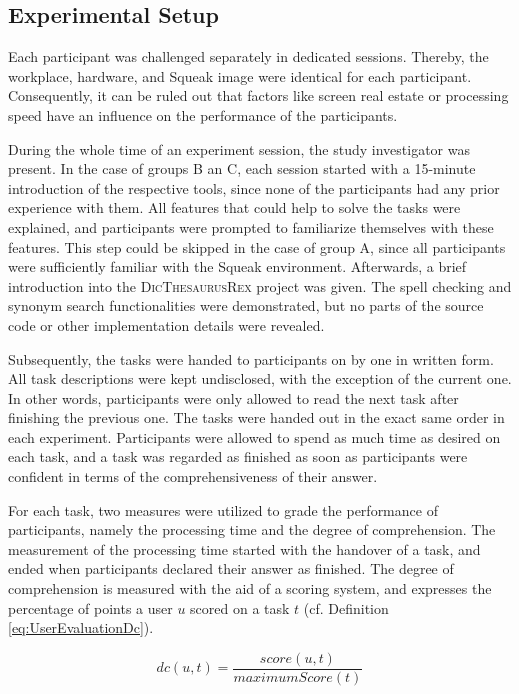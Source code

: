 \subsection{Experimental Setup}
Each participant was challenged separately in dedicated sessions.
Thereby, the workplace, hardware, and Squeak image were identical for each participant.
Consequently, it can be ruled out that factors like screen real estate or processing speed have an influence on the performance of the participants.

During the whole time of an experiment session, the study investigator was present.
In the case of groups B an C, each session started with a 15-minute introduction of the respective tools, since none of the participants had any prior experience with them.
All features that could help to solve the tasks were explained, and participants were prompted to familiarize themselves with these features. 
This step could be skipped in the case of group A, since all participants were sufficiently familiar with the Squeak environment.
Afterwards, a brief introduction into the \textsc{DicThesaurusRex} project was given.
The spell checking and synonym search functionalities were demonstrated, but no parts of the source code or other implementation details were revealed.

Subsequently, the tasks were handed to participants on by one in written form.
All task descriptions were kept undisclosed, with the exception of the current one.
In other words, participants were only allowed to read the next task after finishing the previous one.
The tasks were handed out in the exact same order in each experiment.
Participants were allowed to spend as much time as desired on each task, and a task was regarded as finished as soon as participants were confident in terms of the comprehensiveness of their answer.

For each task, two measures were utilized to grade the performance of participants, namely the processing time and the degree of comprehension.
The measurement of the processing time started with the handover of a task, and ended when participants declared their answer as finished.
The degree of comprehension is measured with the aid of a scoring system, and expresses the percentage of points a user $u$ scored on a task $t$ (cf. Definition \ref{eq:UserEvaluationDc}).

\begin{equation}
dc(u, t) = \frac{score(u, t)}{maximumScore(t)}\label{eq:UserEvaluationDc}
\end{equation}

